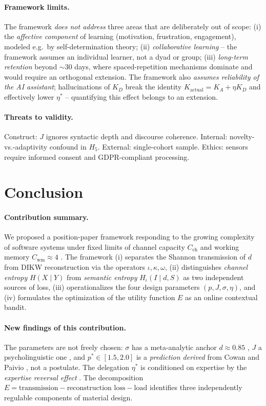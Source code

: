 \documentclass[10pt,a4paper]{article}
\begin{document}
\paragraph{Framework limits.}
The framework \emph{does not address} three areas that are deliberately
out of scope:
(i) the \emph{affective component} of learning (motivation, frustration,
engagement), modeled e.g.\ by self-determination theory;
(ii) \emph{collaborative learning} – the framework assumes an
individual learner, not a dyad or group;
(iii) \emph{long-term retention} beyond $\sim\!30$ days, where
spaced-repetition mechanisms dominate and would require an orthogonal
extension. The framework also \emph{assumes reliability of the AI
assistant}; hallucinations of $K_D$ break the identity
$K_{\text{actual}} = K_A + \eta K_D$ and effectively lower $\eta^{*}$ –
quantifying this effect belongs to an extension.

\paragraph{Threats to validity.} Construct: $J$ ignores syntactic depth
and discourse coherence. Internal: novelty-vs.-adaptivity confound in
$H_5$. External: single-cohort sample. Ethics: sensors require informed
consent and GDPR-compliant processing.

\section{Conclusion}

\paragraph{Contribution summary.}
We proposed a position-paper framework responding to the growing
complexity of software systems under fixed limits of channel capacity
$C_{\text{ch}}$ and working memory $C_{\text{wm}} \approx 4$
\cite{cowan2001}. The framework (i) separates the Shannon transmission
of $d$ from DIKW reconstruction via the operators $\iota, \kappa,
\omega$, (ii) distinguishes \emph{channel entropy} $H(X\mid Y)$ from
\emph{semantic entropy} $H_{\iota}(I\mid d, S)$ as two independent
sources of loss, (iii) operationalizes the four design parameters
$(p, J, \sigma, \eta)$, and (iv) formulates the optimization of the
utility function $E$ as an online contextual bandit.

\paragraph{New findings of this contribution.}
The parameters are not freely chosen: $\sigma$ has a meta-analytic
anchor $d \approx 0.85$ \cite{ginns2006}, $J$ a psycholinguistic one
\cite{brysbaert2018}, and $p^{*} \in [1.5, 2.0]$ is a
\emph{prediction derived} from Cowan and Paivio
\cite{cowan2001,paivio1990}, not a postulate. The delegation $\eta^{*}$
is conditioned on expertise by the \emph{expertise reversal effect}
\cite{kalyuga2007}. The decomposition
$E = \text{transmission} - \text{reconstruction loss} - \text{load}$
identifies three independently regulable components of material design.
\end{document}
